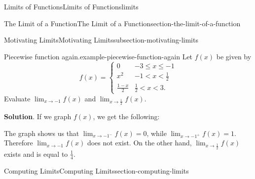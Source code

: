 \documentclass[oneside,10pt,]{book}
\numberwithin{equation}{section}
\begin{document}
\begin{chapterptx}{Limits of Functions}{}{Limits of Functions}{}{}{limits}
\begin{sectionptx}{The Limit of a Function}{}{The Limit of a Function}{}{}{section-the-limit-of-a-function}
\begin{subsectionptx}{Motivating Limits}{}{Motivating Limits}{}{}{subsection-motivating-limits}
\begin{example}{Piecewise function again.}{example-piecewise-function-again}
\hypertarget{p-16}{}%
Let \(f(x)\) be given by%
\begin{equation*}
f(x) = \begin{cases} 0 & -3\leq x \leq -1 \\ x^{2} & -1 < x < \frac{1}{2} \\ \frac{1-x}{2} & \frac{1}{2} < x < 3. \end{cases} 
\end{equation*}
Evaluate \(\lim_{x\to-1}f(x)\) and \(\lim_{x\to\frac{1}{2}}f(x)\).%
\par\smallskip%
\noindent\textbf{Solution}.\hypertarget{solution-3}{}\quad%
\hypertarget{p-17}{}%
If we graph \(f(x)\), we get the following:%
\begin{figure}
\centering
{
}
\end{figure}
\hypertarget{p-18}{}%
The graph shows us that \(\lim_{x\to-1^{-}}f(x) = 0\), while \(\lim_{x\to-1^{+}}f(x) = 1\). Therefore \(\lim_{x\to-1}f(x)\) does not exist. On the other hand, \(\lim_{x\to\frac{1}{2}}f(x)\) exists and is equal to \(\frac{1}{4}\).%
\end{example}
\end{subsectionptx}
\end{sectionptx}
%
%
\typeout{************************************************}
\typeout{************************************************}
%
\begin{sectionptx}{Computing Limits}{}{Computing Limits}{}{}{section-computing-limits}

\end{sectionptx}
\end{chapterptx}
\end{document}

